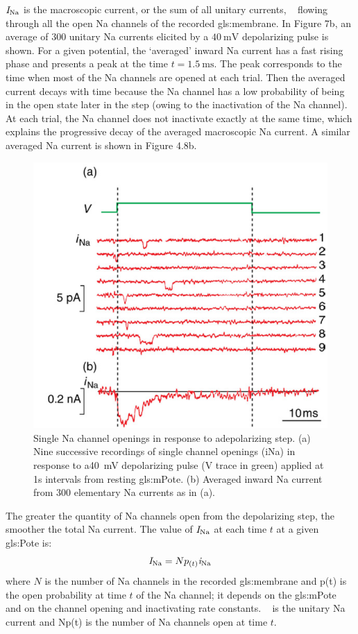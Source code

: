\documentclass[class={myRUCProject}, crop=false]{standalone}
\begin{document}
\(\unit{\cur\sodium}\) is the macroscopic current, or the sum of all unitary currents, \unit{\cur\sodium} flowing through all the open \gls{Na} channels of the recorded \gls{gls:membrane}. In Figure 7b, an average of \(\num{300}\) unitary \gls{Na} currents elicited by a \(\qty{40}{\mV}\) depolarizing pulse is shown. For a given potential, the `averaged' inward \gls{Na} current has a fast rising phase and presents a peak at the time \(t=\qty{1.5}{\ms}\). The peak corresponds to the time when most of the \gls{Na} channels are opened at each trial. Then the averaged current decays with time because the \gls{Na} channel has a low probability of being in the open state later in the step (owing to the inactivation of the \gls{Na} channel). At each trial, the \gls{Na} channel does not inactivate exactly at the same time, which explains the progressive decay of the averaged macroscopic \gls{Na} current. A similar averaged \gls{Na} current is shown in Figure 4.8b. %

\begin{figure}[H]
    \centering
    \includegraphics[width=0.5\linewidth]{Pictures//Anakin/iNa.png}
    \caption{Single \gls{Na} channel openings in response to adepolarizing step. (a) Nine successive recordings of single channel openings (iNa) in response to a\qty{ 40}{\mV} depolarizing pulse (V trace in green) applied at 1s intervals from resting \gls{gls:mPote}. (b) Averaged inward \gls{Na} current from 300 elementary \gls{Na} currents as in (a).  }
    \label{fig:enter-label}
\end{figure}

The greater the quantity of \gls{Na} channels open from the depolarizing step, the smoother the total \gls{Na} current. The value of \(\unit{\cur\sodium}\) at each time \(t\) at a given \gls{gls:Pote} is: 
\begin{equation}
    \unit{\cur\sodium}=N p_{(t)} \unit{\uncur\sodium}
\end{equation}
where \(N\) is the number of \gls{Na} channels in the recorded \gls{gls:membrane} and p(t) is the open probability at time \(t\) of the \gls{Na} channel; it depends on the \gls{gls:mPote} and on the channel opening and inactivating rate constants. \unit{\cur\sodium} is the unitary \gls{Na} current and Np(t) is the number of \gls{Na} channels open at time \(t\). 
\end{document}

